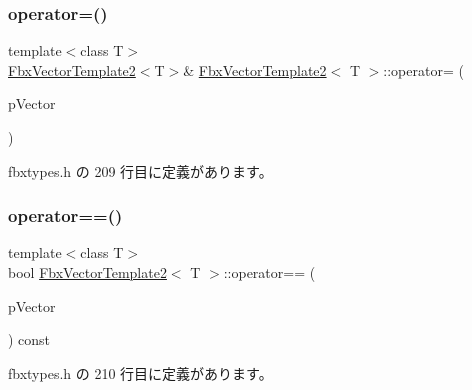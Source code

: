 \mbox{\label{class_fbx_vector_template2_acc052cfaef7530489fdc47ffea2ed78e}} 
\subsubsection{\texorpdfstring{operator=()}{operator=()}\hspace{0.1cm}{\footnotesize\ttfamily [2/2]}}
{\footnotesize\ttfamily template$<$class T$>$ \\
\hyperlink{class_fbx_vector_template2}{Fbx\+Vector\+Template2}$<$T$>$\& \hyperlink{class_fbx_vector_template2}{Fbx\+Vector\+Template2}$<$ T $>$\+::operator= (\begin{DoxyParamCaption}\item[{const \hyperlink{class_fbx_vector_template2}{Fbx\+Vector\+Template2}$<$ T $>$ \&}]{p\+Vector }\end{DoxyParamCaption})\hspace{0.3cm}{\ttfamily [inline]}}



 fbxtypes.\+h の 209 行目に定義があります。

\mbox{\label{class_fbx_vector_template2_ad9921dfc627c8fba190e708555d21c84}} 
\subsubsection{\texorpdfstring{operator==()}{operator==()}}
{\footnotesize\ttfamily template$<$class T$>$ \\
bool \hyperlink{class_fbx_vector_template2}{Fbx\+Vector\+Template2}$<$ T $>$\+::operator== (\begin{DoxyParamCaption}\item[{const \hyperlink{class_fbx_vector_template2}{Fbx\+Vector\+Template2}$<$ T $>$ \&}]{p\+Vector }\end{DoxyParamCaption}) const\hspace{0.3cm}{\ttfamily [inline]}}



 fbxtypes.\+h の 210 行目に定義があります。

\mbox{\label{class_fbx_vector_template2_a51038dd841fd61f144304acbf26c2eb9}} 

